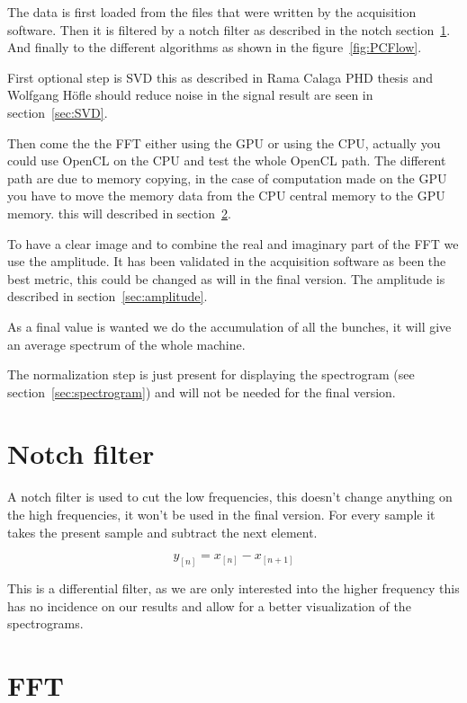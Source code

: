 	The data is first loaded from the files that were written by the acquisition software. Then it is filtered by a notch filter as described in the notch section~\ref{sec:notch}. And finally to the different algorithms as shown in the figure~\ref{fig:PCFlow}.

	First optional step is \gls{SVD} this as described in Rama Calaga PHD thesis\cite{calaga06} and Wolfgang H{\"o}fle\cite{HofleChamonix12} should reduce noise in the signal result are seen in section~\ref{sec:SVD}.

	Then come the the \gls{FFT} either using the \gls{GPU} or using the \gls{CPU}, actually you could use \gls{OpenCL} on the \gls{CPU} and test the whole \gls{OpenCL} path. The different path are due to memory copying, in the case of computation made on the \gls{GPU} you have to move the memory data from the \gls{CPU} central memory to the \gls{GPU} memory. this will described in section~\ref{sec:FFT}.

	To have a clear image and to combine the real and imaginary part of the \gls{FFT} we use the amplitude. It has been validated in the acquisition software as been the best metric, this could be changed as will in the final version. The amplitude is described in section~\ref{sec:amplitude}.

	As a final value is wanted we do the accumulation of all the bunches, it will give an average spectrum of the whole machine.

	The normalization step is just present for displaying the spectrogram (see section~\ref{sec:spectrogram}) and will not be needed for the final version.
 
\section{Notch filter}
\label{sec:notch}

A notch filter is used to cut the low frequencies, this doesn't change anything on the high frequencies, it won't be used in the final version. For every sample it takes the present sample and subtract the next element.

$$y_{[n]} = x_{[n]} - x_{[n + 1]}$$

This is a differential filter, as we are only interested into the higher frequency this has no incidence on our results and allow for a better visualization of the spectrograms.

\section{FFT}
\label{sec:FFT}


